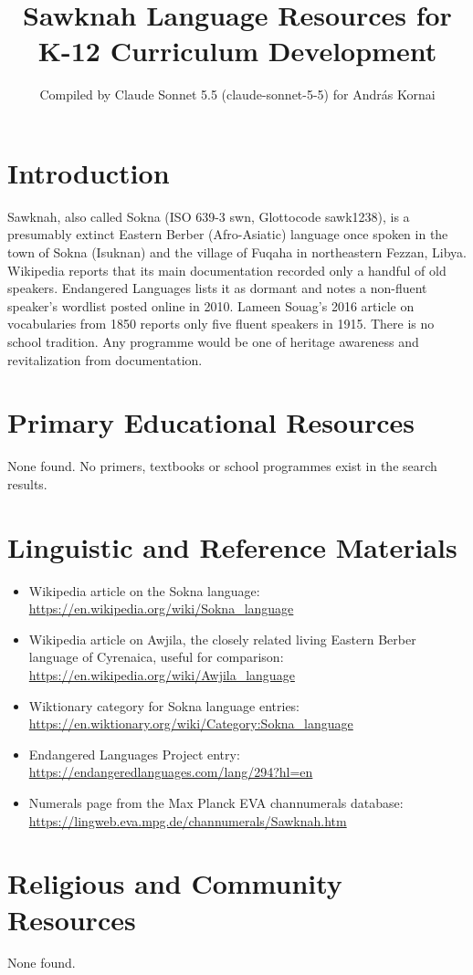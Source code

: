\documentclass[12pt]{article}
\title{Sawknah Language Resources for K-12 Curriculum Development}
\author{Compiled by Claude Sonnet 5.5 (claude-sonnet-5-5) for Andr\'as Kornai}
\date{}
\begin{document}
\maketitle

\section{Introduction}
Sawknah, also called Sokna (ISO 639-3 swn, Glottocode sawk1238), is a presumably extinct Eastern Berber (Afro-Asiatic) language once spoken in the town of Sokna (Isuknan) and the village of Fuqaha in northeastern Fezzan, Libya. Wikipedia reports that its main documentation recorded only a handful of old speakers. Endangered Languages lists it as dormant and notes a non-fluent speaker's wordlist posted online in 2010. Lameen Souag's 2016 article on vocabularies from 1850 reports only five fluent speakers in 1915. There is no school tradition. Any programme would be one of heritage awareness and revitalization from documentation.

\section{Primary Educational Resources}
None found. No primers, textbooks or school programmes exist in the search results.

\section{Linguistic and Reference Materials}
\begin{itemize}
\item Wikipedia article on the Sokna language: \url{https://en.wikipedia.org/wiki/Sokna_language}
\item Wikipedia article on Awjila, the closely related living Eastern Berber language of Cyrenaica, useful for comparison: \url{https://en.wikipedia.org/wiki/Awjila_language}
\item Wiktionary category for Sokna language entries: \url{https://en.wiktionary.org/wiki/Category:Sokna_language}
\item Endangered Languages Project entry: \url{https://endangeredlanguages.com/lang/294?hl=en}
\item Numerals page from the Max Planck EVA channumerals database: \url{https://lingweb.eva.mpg.de/channumerals/Sawknah.htm}
\end{itemize}

\section{Religious and Community Resources}
None found.
\end{document}
